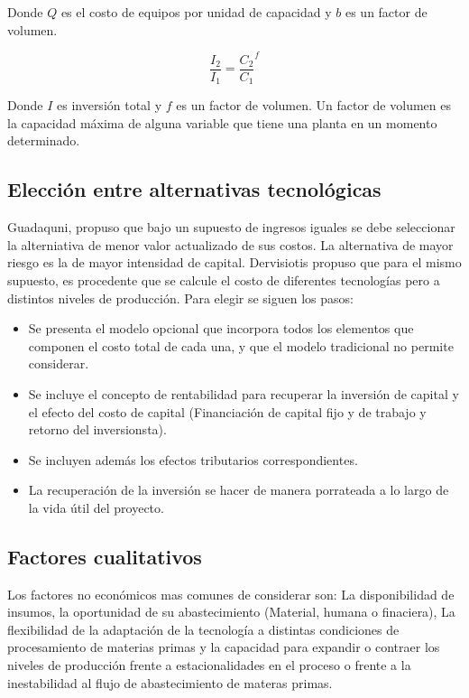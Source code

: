 \documentclass[a4paper, 11pt, oneside]{article}
\begin{document}
Donde $Q$ es el costo de equipos por unidad de capacidad y $b$ es un factor de volumen.

	\[ \frac{I_2}{I_1} = \frac{C_2}{C_1}^{f} \]

Donde $I$ es inversión total y $f$ es un factor de volumen. Un factor de volumen es la capacidad máxima de alguna 
variable que tiene una planta en un momento determinado.

\subsection{Elección entre alternativas tecnológicas}
Guadaquni, propuso que bajo un supuesto de ingresos iguales se debe seleccionar la alterniativa de menor valor
actualizado de sus costos. La alternativa de mayor riesgo es la de mayor intensidad de capital.
Dervisiotis propuso que para el mismo supuesto, es procedente que se calcule el costo de diferentes tecnologías
pero a distintos niveles de producción. Para elegir se siguen los pasos:

\begin{itemize}
	\item Se presenta el modelo opcional que incorpora todos los elementos que componen el costo total de cada una, y
	que el modelo tradicional no permite considerar. 
	\item Se incluye el concepto de rentabilidad para recuperar la inversión de capital y el efecto del costo 
	de capital (Financiación de capital fijo y de trabajo y retorno del inversionsta).
	\item Se incluyen además los efectos tributarios correspondientes. 
	\item La recuperación de la inversión se hacer de manera porrateada a lo largo de la vida útil del proyecto.
\end{itemize}

\subsection{Factores cualitativos}
Los factores no económicos mas comunes de considerar son: La disponibilidad de insumos, la oportunidad de su
abastecimiento (Material, humana o finaciera), La flexibilidad de la adaptación de la tecnología a distintas
condiciones de procesamiento de materias primas y la capacidad para expandir o contraer los niveles de producción
frente a estacionalidades en el proceso o frente a la inestabilidad al flujo de abastecimiento de materas primas.
\end{document}
